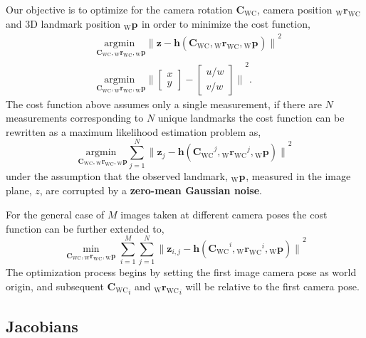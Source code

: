 \documentclass{article}
\renewcommand{\Vec}[1]{{\mathbf{#1}}}
\newcommand{\Mat}[1]{{\mathbf{#1}}}
\newcommand{\Norm}[1]{{\|#1\|}}
\newcommand{\Argmin}[1]{\underset{#1}{{\text{argmin }}}}
\newcommand{\cam}{{\text{C}}}
\newcommand{\world}{{\text{W}}}
\newcommand{\KineNotationTransform}[3]{{{#1}_{#2#3}}}
\newcommand{\KineNotation}[3]{{{{}_{#2}} {#1}_{#2#3}}}
\newcommand{\KineNotationPart}[3]{{{{}_{#2}} {#1}_{#3}}}
\newcommand{\KineNotationBare}[2]{{{{}_{#2}} {#1}}}
\newcommand{\pos}{{\Vec{r}}}
\newcommand{\Pos}[2]{{\KineNotation{\pos}{#1}{#2}}}
\newcommand{\rot}{{\Mat{C}}}
\newcommand{\Rot}[2]{{\KineNotationTransform{\rot}{#1}{#2}}}
\newcommand{\point}{\Vec{p}}
\newcommand{\Pt}[1]{{\KineNotationPart{\point}{#1}{}}}
\newcommand{\Point}[2]{{\KineNotationBare{\point}{#1}}}
\newcommand{\camRot}{{\Rot{\world}{\cam}}}
\newcommand{\camPos}{{\Pos{\world}{\cam}}}
\newcommand{\projFunc}{{\Vec{h}}}
\newcommand{\measurement}{{\Vec{z}}}
\begin{document}
Our objective is to optimize for the camera rotation $\camRot$, camera
position $\camPos$ and 3D landmark position $\Pt{\world}$ in order to
minimize the cost function,
%
\begin{align}
  &\Argmin{\camRot, \camPos, \Pt{\world}} \Norm{
    \measurement - \projFunc(\camRot, \camPos, \Pt{\world})
  }^{2} \\
  &\Argmin{\camRot, \camPos, \Pt{\world}} \Norm{
    \begin{bmatrix} x \\ y \end{bmatrix} -
    \begin{bmatrix} u / w \\ v / w \end{bmatrix}
    }^{2}.
\end{align}
%
The cost function above assumes only a single measurement, if there are $N$
measurements corresponding to $N$ unique landmarks the cost function can be
rewritten as a maximum likelihood estimation problem as,
%
\begin{equation}
  \Argmin{\camRot, \camPos, \Pt{\world}}
  \sum_{j = 1}^{N}
  \Norm{
    \measurement_{j} - \projFunc(\camRot^{j}, \camPos^{j}, \Point{\world}{j})
  }^{2}
\end{equation}
%
under the assumption that the observed landmark, $\Pt{\world}$, measured in
the image plane, $z$, are corrupted by a \textbf{zero-mean Gaussian noise}.

For the general case of $M$ images taken at different camera poses the cost
function can be further extended to,
%
\begin{equation}
  \min_{\camRot, \camPos, \Pt{\world}} 
  \sum_{i = 1}^{M} \sum_{j = 1}^{N}
  \Norm{
    \measurement_{i, j}
    - \projFunc(\camRot^{i}, \camPos^{i}, \Point{\world}{j})
  }^{2}
\end{equation}
%
The optimization process begins by setting the first image camera pose as world
origin, and subsequent $\camRot_{i}$ and $\camPos_{i}$ will be relative to the
first camera pose.


\subsection*{Jacobians}
\end{document}
